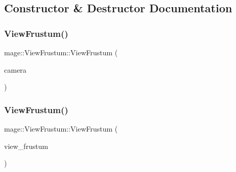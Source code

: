 \subsection{Constructor \& Destructor Documentation}
\hypertarget{classmage_1_1_view_frustum_ad1fd4a59f6cd0fd38289e66d4c6b5d51}{}\label{classmage_1_1_view_frustum_ad1fd4a59f6cd0fd38289e66d4c6b5d51} 
\subsubsection{\texorpdfstring{View\+Frustum()}{ViewFrustum()}\hspace{0.1cm}{\footnotesize\ttfamily [1/2]}}
{\footnotesize\ttfamily mage\+::\+View\+Frustum\+::\+View\+Frustum (\begin{DoxyParamCaption}\item[{const \hyperlink{classmage_1_1_camera}{Camera} \&}]{camera }\end{DoxyParamCaption})}

\hypertarget{classmage_1_1_view_frustum_abbd4ec6c2766d3f630bce16cefa8bc4d}{}\label{classmage_1_1_view_frustum_abbd4ec6c2766d3f630bce16cefa8bc4d} 
\subsubsection{\texorpdfstring{View\+Frustum()}{ViewFrustum()}\hspace{0.1cm}{\footnotesize\ttfamily [2/2]}}
{\footnotesize\ttfamily mage\+::\+View\+Frustum\+::\+View\+Frustum (\begin{DoxyParamCaption}\item[{const \hyperlink{classmage_1_1_view_frustum}{View\+Frustum} \&}]{view\+\_\+frustum }\end{DoxyParamCaption})\hspace{0.3cm}{\ttfamily [default]}}

\hypertarget{classmage_1_1_view_frustum_aaa0e10f5401370909694e923c58323a9}{}\label{classmage_1_1_view_frustum_aaa0e10f5401370909694e923c58323a9} 
